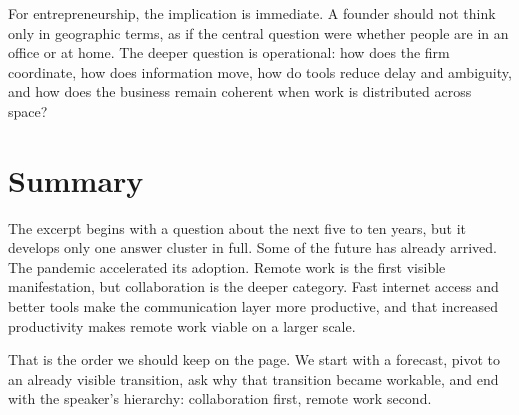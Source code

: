 For entrepreneurship, the implication is immediate. A founder should not think only in geographic terms, as if the central question were whether people are in an office or at home. The deeper question is operational: how does the firm coordinate, how does information move, how do tools reduce delay and ambiguity, and how does the business remain coherent when work is distributed across space?

\section{Summary}

The excerpt begins with a question about the next five to ten years, but it develops only one answer cluster in full. Some of the future has already arrived. The pandemic accelerated its adoption. Remote work is the first visible manifestation, but collaboration is the deeper category. Fast internet access and better tools make the communication layer more productive, and that increased productivity makes remote work viable on a larger scale.

That is the order we should keep on the page. We start with a forecast, pivot to an already visible transition, ask why that transition became workable, and end with the speaker's hierarchy: collaboration first, remote work second.